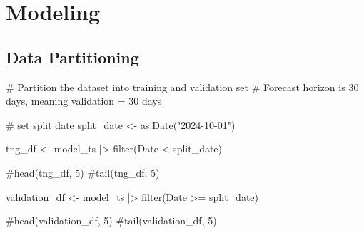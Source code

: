 \documentclass[
  letterpaper,
  DIV=11,
  numbers=noendperiod]{scrartcl}
\newenvironment{Shaded}{\begin{snugshade}}{\end{snugshade}}
\newcommand{\AttributeTok}[1]{\textcolor[rgb]{0.40,0.45,0.13}{#1}}
\newcommand{\CommentTok}[1]{\textcolor[rgb]{0.37,0.37,0.37}{#1}}
\newcommand{\FunctionTok}[1]{\textcolor[rgb]{0.28,0.35,0.67}{#1}}
\newcommand{\NormalTok}[1]{\textcolor[rgb]{0.00,0.23,0.31}{#1}}
\newcommand{\OtherTok}[1]{\textcolor[rgb]{0.00,0.23,0.31}{#1}}
\newcommand{\SpecialCharTok}[1]{\textcolor[rgb]{0.37,0.37,0.37}{#1}}
\newcommand{\StringTok}[1]{\textcolor[rgb]{0.13,0.47,0.30}{#1}}
\begin{document}
\section{Modeling}\label{modeling}

\begin{Shaded}
\end{Shaded}

\subsection{Data Partitioning}\label{data-partitioning}

\begin{Shaded}
\begin{Highlighting}[]
\CommentTok{\# Partition the dataset into training and validation set}
\CommentTok{\# Forecast horizon is 30 days, meaning validation = 30 days}

\CommentTok{\# set split date}
\NormalTok{split\_date }\OtherTok{\textless{}{-}} \FunctionTok{as.Date}\NormalTok{(}\StringTok{"2024{-}10{-}01"}\NormalTok{)}

\NormalTok{tng\_df }\OtherTok{\textless{}{-}}\NormalTok{ model\_ts }\SpecialCharTok{|\textgreater{}}
  \FunctionTok{filter}\NormalTok{(Date }\SpecialCharTok{\textless{}}\NormalTok{ split\_date)}

\CommentTok{\#head(tng\_df, 5)}
\CommentTok{\#tail(tng\_df, 5)}

\NormalTok{validation\_df }\OtherTok{\textless{}{-}}\NormalTok{ model\_ts }\SpecialCharTok{|\textgreater{}}
  \FunctionTok{filter}\NormalTok{(Date }\SpecialCharTok{\textgreater{}=}\NormalTok{ split\_date)}

\CommentTok{\#head(validation\_df, 5)}
\CommentTok{\#tail(validation\_df, 5)}
\end{Highlighting}
\end{Shaded}
\end{document}
